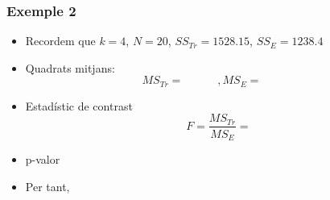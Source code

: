 \documentclass[12pt,t]{beamer}
\theoremstyle{plain}
\theoremstyle{definition}
\begin{document}
\begin{frame} 
\frametitle{Exemple 2}
\begin{itemize}

\item Recordem que $k=4$,  $N=20$, 
$SS_{Tr}=1528.15$, $SS_E=1238.4$
\medskip 

\item Quadrats mitjans:
$$
MS_{Tr}=\qquad\quad, 
MS_E=\qquad\quad{}
$$

\item Estadístic de contrast
$$
F=\frac{MS_{Tr}}{MS_E}=
$$

\item p-valor 
\medskip 

\item Per tant,
\end{itemize}
\end{frame}




\end{document}
